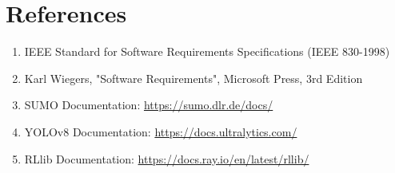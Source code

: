 \section{References}

\begin{enumerate}
\item IEEE Standard for Software Requirements Specifications (IEEE 830-1998)
\item Karl Wiegers, "Software Requirements", Microsoft Press, 3rd Edition
\item SUMO Documentation: \url{https://sumo.dlr.de/docs/}
\item YOLOv8 Documentation: \url{https://docs.ultralytics.com/}
\item RLlib Documentation: \url{https://docs.ray.io/en/latest/rllib/}
\end{enumerate}